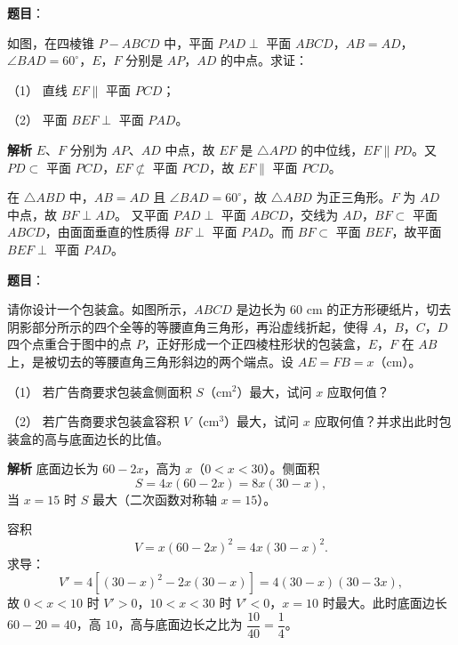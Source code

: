 \begin{answer}

\textbf{题目}：

如图，在四棱锥 $P-ABCD$ 中，平面 $PAD\perp$ 平面 $ABCD$，$AB=AD$，$\angle BAD=60^\circ$，$E$，$F$ 分别是 $AP$，$AD$ 的中点。求证：

（1） 直线 $EF\parallel$ 平面 $PCD$；

（2） 平面 $BEF\perp$ 平面 $PAD$。
\nopagebreak[4]
\begin{center}\end{center}
\nopagebreak[4]
\textbf{解析}
$E$、$F$ 分别为 $AP$、$AD$ 中点，故 $EF$ 是 $\triangle APD$ 的中位线，$EF\parallel PD$。又 $PD\subset$ 平面 $PCD$，$EF\not\subset$ 平面 $PCD$，故 $EF\parallel$ 平面 $PCD$。

在 $\triangle ABD$ 中，$AB=AD$ 且 $\angle BAD=60^\circ$，故 $\triangle ABD$ 为正三角形。$F$ 为 $AD$ 中点，故 $BF\perp AD$。
又平面 $PAD\perp$ 平面 $ABCD$，交线为 $AD$，$BF\subset$ 平面 $ABCD$，由面面垂直的性质得 $BF\perp$ 平面 $PAD$。而 $BF\subset$ 平面 $BEF$，故平面 $BEF\perp$ 平面 $PAD$。



\end{answer}
\begin{answer}

\textbf{题目}：

请你设计一个包装盒。如图所示，$ABCD$ 是边长为 $60$ cm 的正方形硬纸片，切去阴影部分所示的四个全等的等腰直角三角形，再沿虚线折起，使得 $A$，$B$，$C$，$D$ 四个点重合于图中的点 $P$，正好形成一个正四棱柱形状的包装盒，$E$，$F$ 在 $AB$ 上，是被切去的等腰直角三角形斜边的两个端点。设 $AE=FB=x$（cm）。

（1） 若广告商要求包装盒侧面积 $S$（cm$^2$）最大，试问 $x$ 应取何值？

（2） 若广告商要求包装盒容积 $V$（cm$^3$）最大，试问 $x$ 应取何值？并求出此时包装盒的高与底面边长的比值。
\nopagebreak[4]
\begin{center}\end{center}
\nopagebreak[4]
\textbf{解析}
底面边长为 $60-2x$，高为 $x$（$0<x<30$）。侧面积
\nopagebreak[4]
\[S=4x(60-2x)=8x(30-x),\]
当 $x=15$ 时 $S$ 最大（二次函数对称轴 $x=15$）。

容积
\nopagebreak[4]
\[V=x(60-2x)^2=4x(30-x)^2.\]
求导：
\nopagebreak[4]
\[V'=4\left[(30-x)^2-2x(30-x)\right]=4(30-x)(30-3x),\]
故 $0<x<10$ 时 $V'>0$，$10<x<30$ 时 $V'<0$，$x=10$ 时最大。此时底面边长 $60-20=40$，高 $10$，高与底面边长之比为 $\dfrac{10}{40}=\dfrac14$。



\end{answer}
